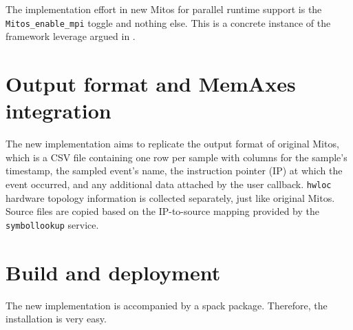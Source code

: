 The implementation effort in new Mitos for parallel runtime support is the \texttt{Mitos\_enable\_mpi} toggle and nothing else. This is a concrete instance of the framework leverage argued in .

\section{Output format and MemAxes integration}\label{sec:output-memaxes}

The new implementation aims to replicate the output format of original Mitos, which is a CSV file containing one row per sample with columns for the sample's timestamp, the sampled event's name, the instruction pointer (IP) at which the event occurred, and any additional data attached by the user callback. \texttt{hwloc} hardware topology information is collected separately, just like original Mitos. Source files are copied based on the IP-to-source mapping provided by the \texttt{symbollookup} service.

\section{Build and deployment}\label{sec:build-deployment}

The new implementation is accompanied by a spack package. Therefore, the installation is very easy.